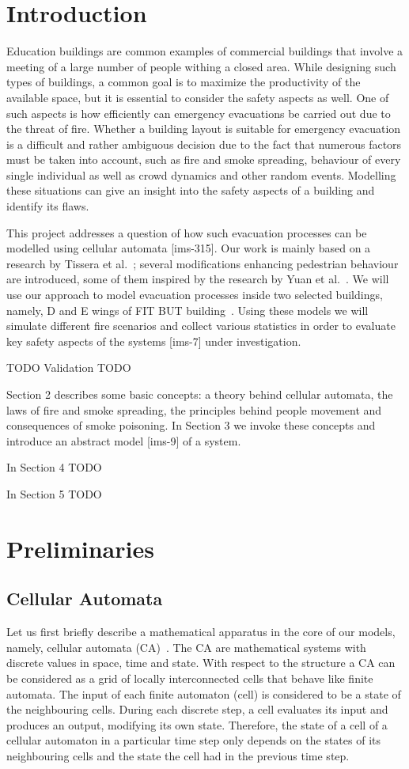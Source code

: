 \section{Introduction}
Education buildings are common examples of commercial buildings that involve a
meeting of a large number of people withing a closed area.
While designing such types of buildings, a common goal is to maximize the
productivity of the available space, but it is essential to consider the
safety aspects as well.
One of such aspects is how efficiently can emergency evacuations be carried out
due to the threat of fire.
Whether a building layout is suitable for emergency evacuation is a difficult
and rather ambiguous decision due to the fact that numerous factors must be
taken into account, such as fire and smoke spreading, behaviour of every single
individual as well as crowd dynamics and other random events.
Modelling these situations can give an insight into the safety aspects of a
building and identify its flaws.

This project addresses a question of how such evacuation processes can be
modelled using cellular automata [ims-315].
Our work is mainly based on a research by Tissera et al.~\cite{Tissera1};
several modifications enhancing pedestrian behaviour are introduced, some of
them inspired by the research by Yuan et al.~\cite{Yuan}.
We will use our approach to model evacuation processes inside two selected
buildings, namely, D and E wings of FIT BUT building~\cite{FIT}.
Using these models we will simulate different fire scenarios and collect
various statistics in order to evaluate key safety aspects of the
systems [ims-7] under investigation.

{TODO Validation TODO}

Section 2 describes some basic concepts: a theory behind cellular automata,
the laws of fire and smoke spreading, the principles behind people movement and consequences of smoke poisoning.
In Section 3 we invoke these concepts and introduce an abstract model [ims-9]
of a system.

{In Section 4 TODO}

{In Section 5 TODO}

\section{Preliminaries}
\subsection{Cellular Automata}
Let us first briefly describe a mathematical apparatus in the core of our
models, namely, cellular automata (CA)~\cite{Wolfram}.
The CA are mathematical systems with discrete values in space, time and
state.
With respect to the structure a CA can be considered as a grid of locally
interconnected cells that behave like finite automata.
The input of each finite automaton (cell) is considered to be a state of the
neighbouring cells.
During each discrete step, a cell evaluates its input and produces an
output, modifying its own state.
Therefore, the state of a cell of a cellular automaton in a particular time
step only depends on the states of its neighbouring cells and the state the
cell had in the previous time step.

